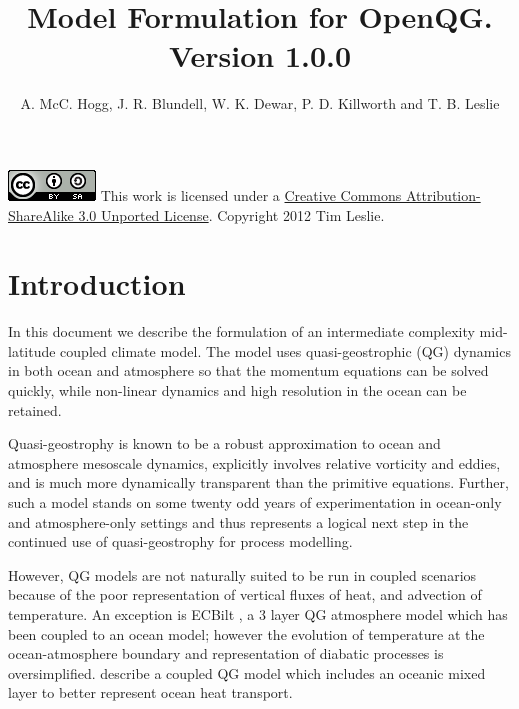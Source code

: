 \documentclass[11pt, a4paper,twoside]{article}
\numberwithin{equation}{section}
\begin{document}
\title{Model Formulation for OpenQG.\\ Version 1.0.0}%
\author{A. McC. Hogg, J. R. Blundell, W. K. Dewar, P. D. Killworth and T. B. Leslie}

\maketitle

\includegraphics[keepaspectratio]{CC-BY-SA.png}
This work is licensed under a \href{http://creativecommons.org/licenses/by-sa/3.0/}{Creative Commons Attribution-ShareAlike 3.0 Unported License}. Copyright 2012 Tim Leslie.

\begin{multicols}{2}
{\small \tableofcontents}
\end{multicols}

\newpage
\section{Introduction}
In this document we describe the formulation of an intermediate complexity mid-latitude coupled climate model.
The model uses quasi-geostrophic (QG) dynamics in both ocean and atmosphere so that the momentum equations can be solved quickly, while non-linear dynamics and high resolution in the ocean can be retained.

Quasi-geostrophy is known to be a robust approximation to ocean and atmosphere mesoscale dynamics, explicitly involves relative vorticity and eddies, and is much more dynamically transparent than the primitive equations.
Further, such a model stands on some twenty odd years of experimentation in ocean-only and atmosphere-only settings and thus represents a logical next step in the continued use of quasi-geostrophy for process modelling.

However, QG models are not naturally suited to be run in coupled scenarios because of the poor representation of vertical fluxes of heat, and advection of temperature.
An exception is ECBilt \citep{opsteegh:98}, a 3 layer QG atmosphere model which has been coupled to an ocean model; however the evolution of temperature at the ocean-atmosphere boundary and representation of diabatic processes is oversimplified.
\citet{kravtsov:02} describe a coupled QG model  which includes an oceanic mixed layer to better represent ocean heat transport.
\end{document}
